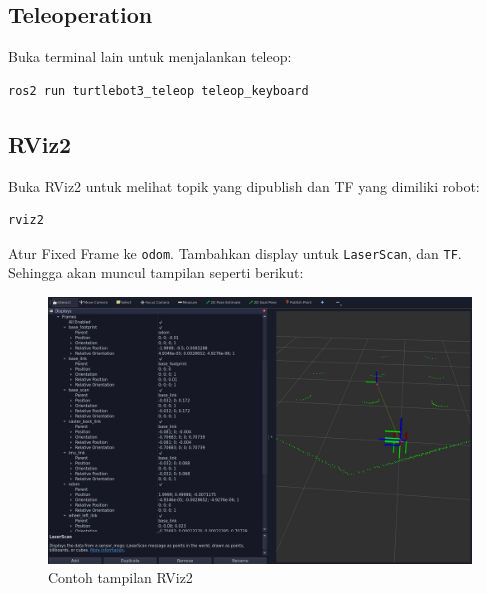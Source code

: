 \documentclass{article}
\begin{document}
\subsection{Teleoperation}
Buka terminal lain untuk menjalankan teleop:
\begin{verbatim}
ros2 run turtlebot3_teleop teleop_keyboard
\end{verbatim}

\subsection{RViz2}
Buka RViz2 untuk melihat topik yang dipublish dan TF yang dimiliki robot:
\begin{verbatim}
rviz2
\end{verbatim}
Atur Fixed Frame ke \texttt{odom}.
Tambahkan display untuk \texttt{LaserScan}, dan \texttt{TF}.
Sehingga akan muncul tampilan seperti berikut:
\begin{figure}[H]
  \centering
  \includegraphics[width=1\textwidth]{rviz2.png}
  \caption{Contoh tampilan RViz2}
\end{figure}
\end{document}
